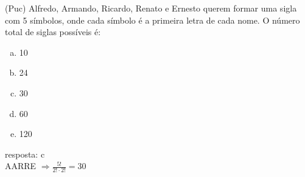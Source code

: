 \begin{ex}
 (Puc) Alfredo, Armando, Ricardo, Renato e Ernesto querem formar uma sigla com 5 símbolos, onde cada símbolo é a primeira letra de cada nome. O número total de siglas possíveis é:
    \begin{enumerate}[(a)]
    \item 10
    \item 24
    \item 30
    \item 60
    \item 120
    \end{enumerate}
      \begin{sol}
        resposta: c \\
        AARRE $\Longrightarrow \frac{5!}{2!\cdot2!}=30$
      \end{sol}
\end{ex}
